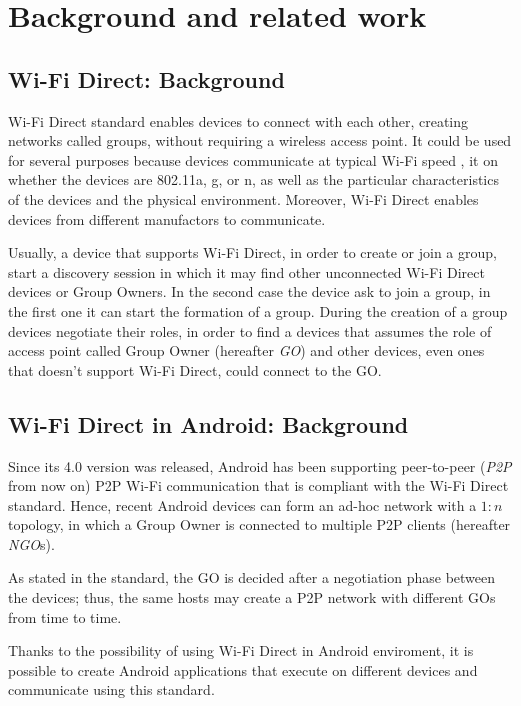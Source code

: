 \section{Background and related work} %
\subsection{Wi-Fi Direct: Background}
Wi-Fi Direct standard enables devices to connect with each other, creating 
networks called groups, without requiring a wireless access point. It could be 
used for several purposes because devices communicate at typical Wi-Fi speed 
\cite{bib:wifiP2pspec}, it on whether the devices are 802.11a, g, or n, as well
as the particular characteristics of the devices and the physical environment.
Moreover, Wi-Fi Direct enables devices from different manufactors to communicate.

Usually, a device that supports Wi-Fi Direct, in order to create or join a group,
start a discovery session in which it may find other unconnected Wi-Fi Direct 
devices or Group Owners. In the second case the device ask to join a group, in the 
first one it can start the formation of a group. During the creation of a group 
devices negotiate their roles, in order to find a devices that assumes the role of 
access point called Group Owner (hereafter \textit{GO}) and other devices, even 
ones that doesn't support Wi-Fi Direct, could connect to the GO. 

\subsection{Wi-Fi Direct in Android: Background}
Since its 4.0 version was released, Android has been supporting peer-to-peer 
(\textit{P2P} from now on) P2P Wi-Fi communication that is compliant with the 
Wi-Fi Direct standard\cite{bib:wifiP2pspec}. 
Hence, recent Android devices can form an ad-hoc network with a $1:n$ topology,
in which a Group Owner is connected to multiple P2P clients (hereafter \textit{NGO}s).

As stated in the standard, the GO is decided after a negotiation phase between
the devices; thus, the same hosts may create a P2P network with different GOs
from time to time.

Thanks to the possibility of using Wi-Fi Direct in Android enviroment, it is 
possible to create Android applications that execute on different devices and 
communicate using this standard. 

